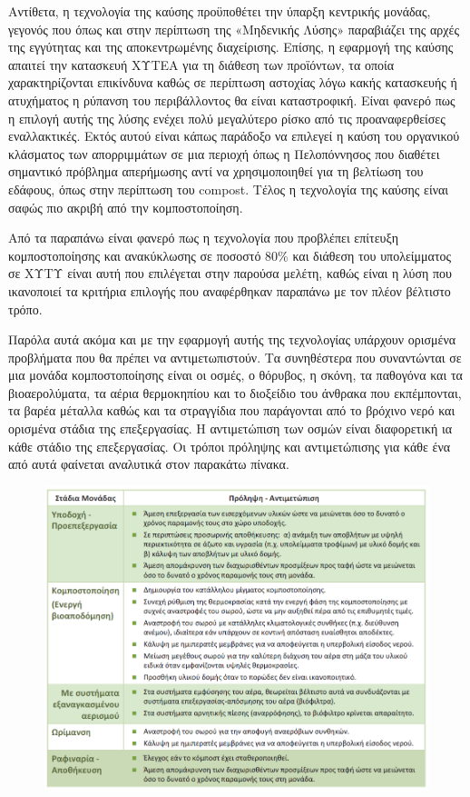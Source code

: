 \documentclass[12pt]{article}
\begin{document}
 	Αντίθετα, η τεχνολογία της καύσης προϋποθέτει την ύπαρξη κεντρικής μονάδας, γεγονός που όπως και στην περίπτωση της «Μηδενικής Λύσης» παραβιάζει της αρχές της εγγύτητας και της αποκεντρωμένης διαχείρισης. Επίσης, η εφαρμογή της καύσης απαιτεί την κατασκευή ΧΥΤΕΑ για τη διάθεση των προϊόντων, τα οποία χαρακτηρίζονται επικίνδυνα καθώς σε περίπτωση αστοχίας λόγω κακής κατασκευής ή ατυχήματος η ρύπανση του περιβάλλοντος θα είναι καταστροφική. Είναι φανερό πως η επιλογή αυτής της λύσης ενέχει πολύ μεγαλύτερο ρίσκο από τις προαναφερθείσες εναλλακτικές. Εκτός αυτού είναι κάπως παράδοξο να επιλεγεί η καύση του οργανικού κλάσματος των απορριμμάτων σε μια περιοχή όπως η Πελοπόννησος που διαθέτει σημαντικό πρόβλημα απερήμωσης αντί να χρησιμοποιηθεί για τη βελτίωση του εδάφους, όπως στην περίπτωση του compost. Τέλος η τεχνολογία της καύσης είναι σαφώς πιο ακριβή από την κομποστοποίηση. 
 	
 	Από τα παραπάνω είναι φανερό πως η τεχνολογία που προβλέπει επίτευξη  κομποστοποίησης και ανακύκλωσης σε ποσοστό 80\% και διάθεση του υπολείμματος σε ΧΥΤΥ είναι αυτή που επιλέγεται στην παρούσα μελέτη, καθώς είναι η λύση που ικανοποιεί τα κριτήρια επιλογής που αναφέρθηκαν παραπάνω με τον πλέον βέλτιστο τρόπο.
 	
 	Παρόλα αυτά ακόμα και με την εφαρμογή αυτής της τεχνολογίας υπάρχουν ορισμένα προβλήματα που θα πρέπει να αντιμετωπιστούν. Τα συνηθέστερα που συναντώνται σε μια μονάδα κομποστοποίησης είναι οι οσμές, ο θόρυβος, η σκόνη, τα παθογόνα και τα βιοαερολύματα, τα αέρια θερμοκηπίου και το διοξείδιο του άνθρακα που εκπέμπονται, τα βαρέα μέταλλα καθώς και τα στραγγίδια που παράγονται από το βρόχινο νερό και ορισμένα στάδια της επεξεργασίας. Η αντιμετώπιση των οσμών είναι διαφορετική ια κάθε στάδιο της επεξεργασίας. Οι τρόποι πρόληψης και αντιμετώπισης για κάθε ένα από αυτά φαίνεται αναλυτικά στον παρακάτω πίνακα.
 	
 	\begin{figure} [H]
 		\begin{center}
 			\includegraphics [scale = 0.40] {pinakas.png}
 		\end{center}
 	\end{figure}
 
\end{document}
